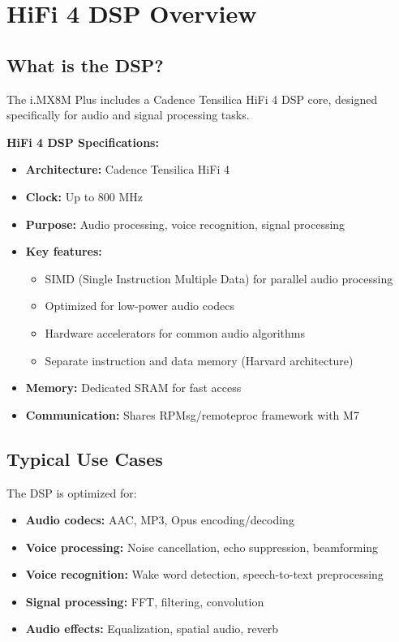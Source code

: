 \documentclass[12pt,a4paper]{report}
\begin{document}
\section{HiFi 4 DSP Overview}

\subsection{What is the DSP?}

The i.MX8M Plus includes a Cadence Tensilica HiFi 4 DSP core, designed specifically for audio and signal processing tasks.

\begin{hardware}
\textbf{HiFi 4 DSP Specifications:}
\begin{itemize}
    \item \textbf{Architecture:} Cadence Tensilica HiFi 4
    \item \textbf{Clock:} Up to 800 MHz
    \item \textbf{Purpose:} Audio processing, voice recognition, signal processing
    \item \textbf{Key features:}
    \begin{itemize}
        \item SIMD (Single Instruction Multiple Data) for parallel audio processing
        \item Optimized for low-power audio codecs
        \item Hardware accelerators for common audio algorithms
        \item Separate instruction and data memory (Harvard architecture)
    \end{itemize}
    \item \textbf{Memory:} Dedicated SRAM for fast access
    \item \textbf{Communication:} Shares RPMsg/remoteproc framework with M7
\end{itemize}
\end{hardware}

\subsection{Typical Use Cases}

The DSP is optimized for:
\begin{itemize}
    \item \textbf{Audio codecs:} AAC, MP3, Opus encoding/decoding
    \item \textbf{Voice processing:} Noise cancellation, echo suppression, beamforming
    \item \textbf{Voice recognition:} Wake word detection, speech-to-text preprocessing
    \item \textbf{Signal processing:} FFT, filtering, convolution
    \item \textbf{Audio effects:} Equalization, spatial audio, reverb
\end{itemize}
\end{document}
